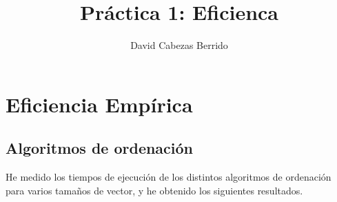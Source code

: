 \documentclass[a4]{article}
\author{David Cabezas Berrido}
\date{\vspace{-5mm}}
\title{\huge Práctica 1: Eficienca \HRule\vspace{-4mm}}
\begin{document}
\maketitle

\tableofcontents

\newpage
\section{Eficiencia Empírica}

\subsection{Algoritmos de ordenación}

\begin{flushleft}
  He medido los tiempos de ejecución de los distintos algoritmos de
  ordenación para varios tamaños de vector, y he obtenido los
  siguientes resultados.
\end{flushleft}
\end{document}
